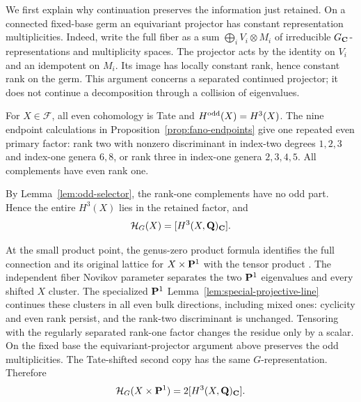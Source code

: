 We first explain why continuation preserves the information just retained.
On a connected fixed-base germ an equivariant projector has constant
representation multiplicities. Indeed, write the full fiber as a sum
$\bigoplus_i V_i\otimes M_i$ of irreducible $G_\mathbf C$-representations and
multiplicity spaces. The projector acts by the identity on $V_i$ and an
idempotent on $M_i$. Its image has locally constant rank, hence constant
rank on the germ. This argument concerns a separated continued projector;
it does not continue a decomposition through a collision of eigenvalues.

For $X\in\mathcal F$, all even cohomology is Tate and
$H^{\mathrm{odd}}(X)=H^3(X)$. The nine endpoint calculations in Proposition~\ref{prop:fano-endpoints} give one
repeated even primary factor: rank two with nonzero discriminant in
index-two degrees $1,2,3$ and index-one genera $6,8$, or rank three in
index-one genera $2,3,4,5$. All complements have even rank one.

By Lemma~\ref{lem:odd-selector}, the rank-one complements have no odd
part. Hence the entire $H^3(X)$ lies in the retained factor, and
\[
 \mathcal H_G(X)=[H^3(X,\mathbf Q)_\mathbf C].
\]

At the small product point, the genus-zero product formula identifies the
full connection and its original lattice for $X\times\mathbf P^1$ with the
tensor product \cite[formula~(1)]{Behrend}. The independent fiber Novikov
parameter separates the two $\mathbf P^1$ eigenvalues and every shifted
$X$ cluster. The specialized $\mathbf P^1$ Lemma~\ref{lem:special-projective-line} continues these
clusters in all even bulk directions, including mixed ones: cyclicity and
even rank persist, and the rank-two discriminant is unchanged. Tensoring
with the regularly separated rank-one factor changes the residue only
by a scalar. On the fixed base the equivariant-projector argument above
preserves the odd multiplicities. The Tate-shifted second copy has the
same $G$-representation. Therefore
\[
 \mathcal H_G(X\times\mathbf P^1)=2[H^3(X,\mathbf Q)_\mathbf C].
\]

